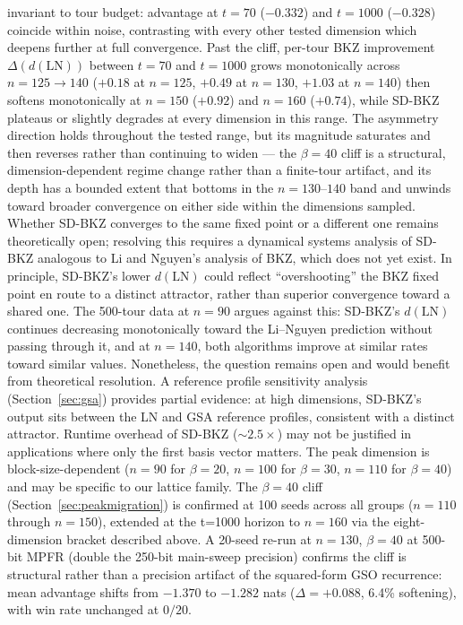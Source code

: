 \documentclass[journal=cic,version=preprint]{iacrj}
\begin{document}
invariant to tour budget: advantage at $t=70$ ($-0.332$) and $t=1000$ ($-0.328$) coincide within noise, contrasting with every other tested dimension which deepens further at full convergence. Past the cliff, per-tour BKZ improvement $\Delta(d(\mathrm{LN}))$ between $t=70$ and $t=1000$ grows monotonically across $n=125 \to 140$ ($+0.18$ at $n=125$, $+0.49$ at $n=130$, $+1.03$ at $n=140$) then softens monotonically at $n=150$ ($+0.92$) and $n=160$ ($+0.74$), while SD-BKZ plateaus or slightly degrades at every dimension in this range. The asymmetry direction holds throughout the tested range, but its magnitude saturates and then reverses rather than continuing to widen --- the $\beta=40$ cliff is a structural, dimension-dependent regime change rather than a finite-tour artifact, and its depth has a bounded extent that bottoms in the $n=130$--$140$ band and unwinds toward broader convergence on either side within the dimensions sampled. Whether SD-BKZ converges to the same fixed point or a different one remains theoretically open; resolving this requires a dynamical systems analysis of SD-BKZ analogous to Li and Nguyen's analysis of BKZ, which does not yet exist. In principle, SD-BKZ's lower $d(\mathrm{LN})$ could reflect ``overshooting'' the BKZ fixed point en route to a distinct attractor, rather than superior convergence toward a shared one. The 500-tour data at $n=90$ argues against this: SD-BKZ's $d(\mathrm{LN})$ continues decreasing monotonically toward the Li--Nguyen prediction without passing through it, and at $n=140$, both algorithms improve at similar rates toward similar values. Nonetheless, the question remains open and would benefit from theoretical resolution. A reference profile sensitivity analysis (Section~\ref{sec:gsa}) provides partial evidence: at high dimensions, SD-BKZ's output sits between the LN and GSA reference profiles, consistent with a distinct attractor. Runtime overhead of SD-BKZ (${\sim}2.5\times$) may not be justified in applications where only the first basis vector matters. The peak dimension is block-size-dependent ($n=90$ for $\beta=20$, $n=100$ for $\beta=30$, $n=110$ for $\beta=40$) and may be specific to our lattice family. The $\beta=40$ cliff (Section~\ref{sec:peakmigration}) is confirmed at 100 seeds across all groups ($n=110$ through $n=150$), extended at the t=1000 horizon to $n=160$ via the eight-dimension bracket described above. A 20-seed re-run at $n=130$, $\beta=40$ at 500-bit MPFR (double the 250-bit main-sweep precision) confirms the cliff is structural rather than a precision artifact of the squared-form GSO recurrence: mean advantage shifts from $-1.370$ to $-1.282$ nats ($\Delta=+0.088$, 6.4\% softening), with win rate unchanged at $0/20$.
\end{document}
